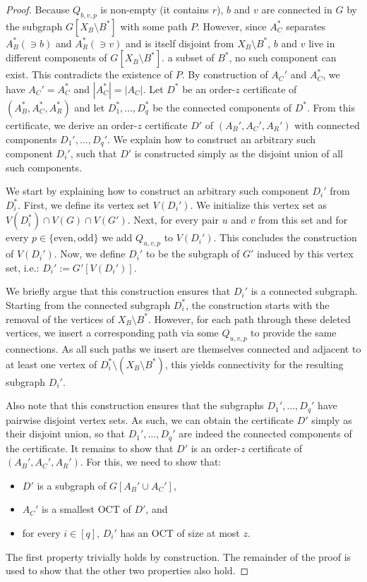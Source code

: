 \begin{proof}
	Because $Q_{b,v,p}$ is non-empty (it contains $r$), $b$ and $v$ are connected in $G$ by the subgraph $G[X_B \setminus B^\ast]$ with some path $P$. However, since $A_C^\ast$ separates $A_B^\ast (\ni b)$ and $A_R^\ast (\ni v)$ and is itself disjoint from $X_B \setminus B^\ast$, $b$ and $v$ live in different components of $G[X_B \setminus B^\ast]$. a subset of $B^\ast$, no such component can exist. This contradicts the existence of $P$.
	 By construction of $A_C'$ and $A_C^\ast$, we have $A_C' = A_C^\ast$ and $|A_C^\ast| = |A_C|$.
	 Let $D^\ast$ be an order-$z$ certificate of $(A_B^\ast, A_C^\ast, A_R^\ast)$ and let $D_1^\ast, \ldots, D_q^\ast$ be the connected components of $D^\ast$. From this certificate, we derive an order-$z$ certificate $D'$ of $(A_B', A_C', A_R')$ with connected components $D_1', \ldots, D_q'$. We explain how to construct an arbitrary such component $D_i'$, such that $D'$ is constructed simply as the disjoint union of all such components.
	
	We start by explaining how to construct an arbitrary such component $D_i'$ from $D_i^\ast$. First, we define its vertex set $V(D_i')$. We initialize this vertex set as $V(D_i^\ast) \cap V(G) \cap V(G')$. Next, for every pair $u$ and $v$ from this set and for every $p \in \{\text{even}, \text{odd}\}$ we add $Q_{u,v,p}$ to $V(D_i')$. This concludes the construction of $V(D_i')$. Now, we define $D_i'$ to be the subgraph of $G'$ induced by this vertex set, i.e.: $D_i' := G'[V(D_i')]$.
	
	We briefly argue that this construction ensures that $D_i'$ is a connected subgraph. Starting from the connected subgraph $D_i^\ast$, the construction starts with the removal of the vertices of $X_B \setminus B^\ast$. However, for each path through these deleted vertices, we insert a corresponding path via some $Q_{u, v, p}$ to provide the same connections. As all such paths we insert are themselves connected and adjacent to at least one vertex of $D_i^\ast \setminus (X_B \setminus B^\ast)$, this yields connectivity for the resulting subgraph $D_i'$.
	
	Also note that this construction ensures that the subgraphs $D_1', \ldots, D_q'$ have pairwise disjoint vertex sets. As such, we can obtain the certificate $D'$ simply as their disjoint union, so that $D_1', \ldots, D_q'$ are indeed the connected components of the certificate. It remains to show that $D'$ is an order-$z$ certificate of $(A_B', A_C', A_R')$. For this, we need to show that:
	\begin{itemize}
		\item $D'$ is a subgraph of $G[A_B' \cup A_C']$,
		\item $A_C'$ is a smallest OCT of $D'$, and
		\item for every $i \in [q]$, $D_i'$ has an OCT of size at most $z$.
	\end{itemize}
	The first property trivially holds by construction. The remainder of the proof is used to show that the other two properties also hold.
	

\end{proof}
